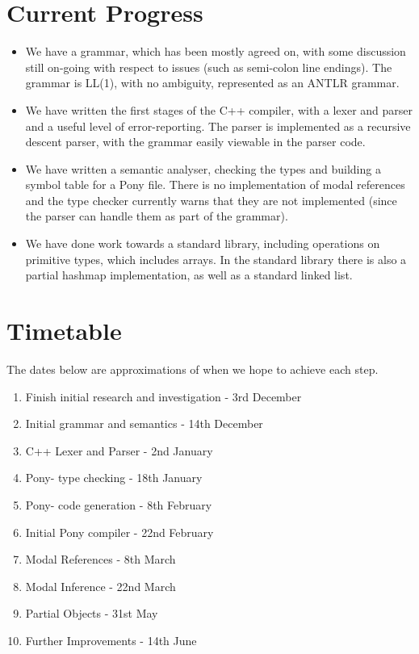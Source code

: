 \documentclass[11pt,a4paper]{report}
\begin{document}
\section{Current Progress}

\begin{itemize}
\item We have a grammar, which has been mostly agreed on, with some discussion still on-going with respect to issues (such as semi-colon line endings).
	The grammar is LL(1), with no ambiguity, represented as an ANTLR grammar. 
\item We have written the first stages of the C++ compiler, with a lexer and parser and a useful level of error-reporting.
	The parser is implemented as a recursive descent parser, with the grammar easily viewable in the parser code.
\item We have written a semantic analyser, checking the types and building a symbol table for a Pony file.
	There is no implementation of modal references and the type checker currently warns that they are not implemented (since the parser can handle them as part of the grammar).
\item We have done work towards a standard library, including operations on primitive types, which includes arrays.
	In the standard library there is also a partial hashmap implementation, as well as a standard linked list.
\end{itemize}

\section{Timetable}

The dates below are approximations of when we hope to achieve each step.

\begin{enumerate}[noitemsep]
	\item Finish initial research and investigation - 3rd December
	\item Initial grammar and semantics - 14th December
	\item C++ Lexer and Parser - 2nd January
	\item Pony- type checking - 18th January
	\item Pony- code generation - 8th February
	\item Initial Pony compiler - 22nd February
	\item Modal References - 8th March
	\item Modal Inference - 22nd March
	\item Partial Objects - 31st May
	\item Further Improvements - 14th June
\end{enumerate}
\end{document}
